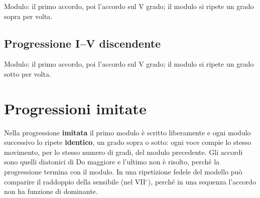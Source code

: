 Modulo: il primo accordo, poi l'accordo sul V grado; il modulo si ripete un grado sopra per volta.

\begin{esempio}
	\label{ex:prog_i5a_dia}
\end{esempio}

\begin{esempio}
	\label{ex:prog_i5a_rea}
\end{esempio}

\subsection{Progressione I--V discendente}
\label{subsec:prog_i5d}

Modulo: il primo accordo, poi l'accordo sul V grado; il modulo si ripete un grado sotto per volta.

\begin{esempio}
	\label{ex:prog_i5d_dia}
\end{esempio}

\begin{esempio}
	\label{ex:prog_i5d_rea}
\end{esempio}

\section{Progressioni imitate}
\label{sec:progressioni_imitate}

Nella progressione \textbf{imitata} il primo modulo è scritto liberamente e ogni modulo successivo lo ripete \textbf{identico}, un grado sopra o sotto: ogni voce compie lo stesso movimento, per lo stesso numero di gradi, del modulo precedente. Gli accordi sono quelli diatonici di Do maggiore e l'ultimo non è risolto, perché la progressione termina con il modulo. In una ripetizione fedele del modello può comparire il raddoppio della sensibile (nel VII$^\circ$), perché in una sequenza l'accordo non ha funzione di dominante.

\begin{esempio}
	\label{ex:imitata_i4d}
\end{esempio}

\begin{esempio}
	\label{ex:imitata_i4a}
\end{esempio}

\begin{esempio}
	\label{ex:imitata_i5a}
\end{esempio}
